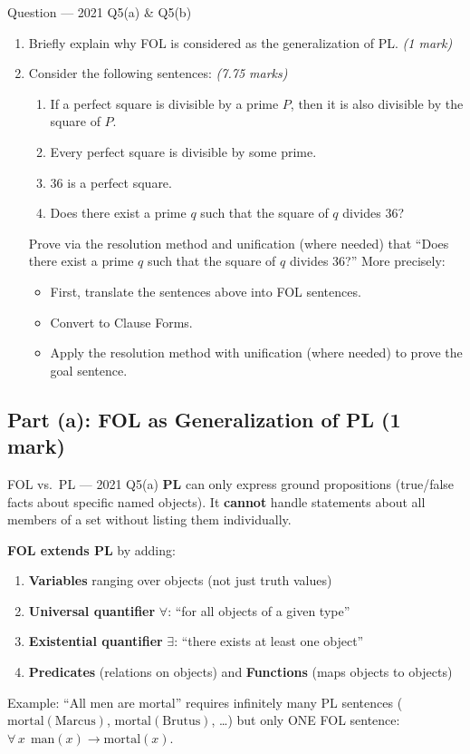 \documentclass[12pt,a4paper]{article}
\newcommand{\ALL}[1]{\forall\,#1\;}
\newcommand{\ra}{\rightarrow}
\begin{document}
\begin{qbox}{Question --- 2021 Q5(a) \& Q5(b)}
\begin{enumerate}[label=(\alph*),noitemsep]
  \item Briefly explain why FOL is considered as the generalization of PL. \hfill\textit{(1 mark)}
  \item Consider the following sentences: \hfill\textit{(7.75 marks)}
    \begin{enumerate}[label=(\roman*),noitemsep]
      \item If a perfect square is divisible by a prime $P$, then it is also divisible by the square of $P$.
      \item Every perfect square is divisible by some prime.
      \item 36 is a perfect square.
      \item Does there exist a prime $q$ such that the square of $q$ divides 36?
    \end{enumerate}
    Prove via the resolution method and unification (where needed) that ``Does there exist a prime $q$ such that the square of $q$ divides 36?'' More precisely:
    \begin{itemize}[noitemsep]
      \item[(i)] First, translate the sentences above into FOL sentences.
      \item[(ii)] Convert to Clause Forms.
      \item[(iii)] Apply the resolution method with unification (where needed) to prove the goal sentence.
    \end{itemize}
\end{enumerate}
\end{qbox}

\subsection{Part (a): FOL as Generalization of PL (1 mark)}

\begin{solbox}{FOL vs.\ PL --- 2021 Q5(a)}
\textbf{PL} can only express ground propositions (true/false facts about specific named objects). It \textbf{cannot} handle statements about all members of a set without listing them individually.

\textbf{FOL extends PL} by adding:
\begin{enumerate}[noitemsep]
  \item \textbf{Variables} ranging over objects (not just truth values)
  \item \textbf{Universal quantifier} $\forall$: ``for all objects of a given type''
  \item \textbf{Existential quantifier} $\exists$: ``there exists at least one object''
  \item \textbf{Predicates} (relations on objects) and \textbf{Functions} (maps objects to objects)
\end{enumerate}
Example: ``All men are mortal'' requires infinitely many PL sentences ($\mathrm{mortal(Marcus)}$, $\mathrm{mortal(Brutus)}$, \ldots) but only ONE FOL sentence: $\ALL{x}\,\mathrm{man}(x) \ra \mathrm{mortal}(x)$.
\end{solbox}
\end{document}
